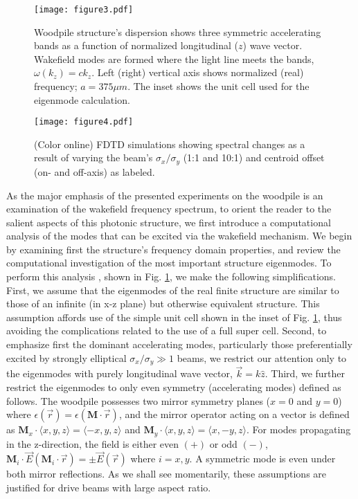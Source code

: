 \documentclass{article}
\begin{document}
\begin{figure}
\texttt{[image: figure3.pdf]}
\caption{\label{fig:fig3}Woodpile structure's dispersion shows three symmetric accelerating bands as a function of normalized longitudinal ($z$) wave vector. Wakefield modes are formed where the light line meets the bands, $\omega(k_z) = ck_z$. Left (right) vertical axis shows normalized (real) frequency; $a = 375 \mu m$. The inset shows the unit cell used for the eigenmode calculation.}
\end{figure}
\begin{figure}
\texttt{[image: figure4.pdf]}
\caption{\label{fig:fig4}(Color online) FDTD simulations showing spectral changes as a result of varying the beam's $\sigma_x/\sigma_y$ (1:1 and 10:1) and centroid offset (on- and off-axis) as labeled.}
\end{figure}
As the major emphasis of the presented experiments on the woodpile is an examination of the wakefield frequency spectrum, to orient the reader to the salient aspects of this photonic structure, we first introduce a computational analysis of the modes that can be excited via the wakefield mechanism. We begin by examining first the structure's frequency domain properties, and review the computational investigation of the most important structure eigenmodes. To perform this analysis \cite{Johnson2001}, shown in Fig. \ref{fig:fig3}, we make the following simplifications. First, we assume that the eigenmodes of the real finite structure are similar to those of an infinite (in x-z plane) but otherwise equivalent structure. This assumption affords use of the simple unit cell shown in the inset of Fig. \ref{fig:fig3}, thus avoiding the complications related to the use of a full super cell. Second, to emphasize first the dominant accelerating modes, particularly those preferentially excited by strongly elliptical $\sigma_x/\sigma_y \gg 1$ beams, we restrict our attention only to the eigenmodes with purely longitudinal wave vector, $\vec{k} = k\hat{z}$. Third, we further restrict the eigenmodes to only even symmetry (accelerating modes) defined as follows. The woodpile possesses two mirror symmetry planes ($x=0$ and $y=0$) where $\epsilon(\vec{r})=\epsilon(\mathcal{\bm{M}}\cdot\vec{r})$, and the mirror operator acting on a vector is defined as $\mathcal{\bm{M}}_{x}\cdot\langle x,y,z \rangle=\langle -x,y,z \rangle$ and $\mathcal{\bm{M}}_{y}\cdot\langle x,y,z \rangle =\langle x,-y,z \rangle$. For modes propagating in the z-direction, the field is either even $(+)$ or odd $(-)$, $\mathcal{\bm{M}}_{i}\cdot\vec{E}(\mathcal{\bm{M}}_{i}\cdot\vec{r})=\pm \vec{E}(\vec{r})$ where $i=x,y$. A symmetric mode is even under both mirror reflections. As we shall see momentarily, these assumptions are justified for drive beams with large aspect ratio. 
\end{document}
